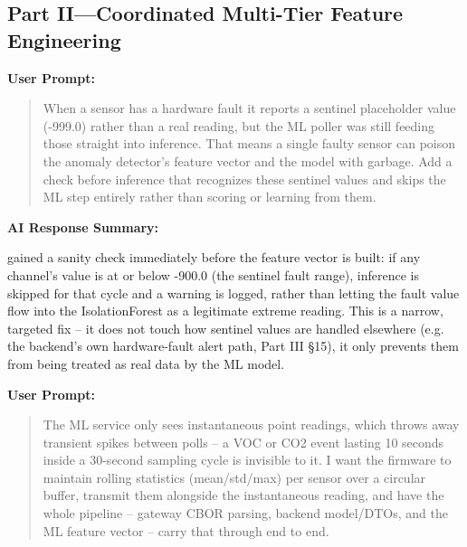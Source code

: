 \documentclass[conference]{IEEEtran}
\begin{document}
\subsection*{Part II---Coordinated Multi-Tier Feature Engineering}

\par\vspace{4pt}\par\vspace{2pt}

\noindent\textbf{User Prompt:}\par

\begin{quote}
When a sensor has a hardware fault it reports a sentinel placeholder value (-999.0) rather than a real reading, but the ML poller was still feeding those straight into inference. That means a single faulty sensor can poison the anomaly detector's feature vector and the model with garbage. Add a check before inference that recognizes these sentinel values and skips the ML step entirely rather than scoring or learning from them.
\end{quote}

\noindent\textbf{AI Response Summary:}\par

\texttt{} gained a sanity check immediately before the feature vector is built: if any channel's value is at or below -900.0 (the sentinel fault range), inference is skipped for that cycle and a warning is logged, rather than letting the fault value flow into the IsolationForest as a legitimate extreme reading. This is a narrow, targeted fix -- it does not touch how sentinel values are handled elsewhere (e.g. the backend's own hardware-fault alert path, Part III \S15), it only prevents them from being treated as real data by the ML model.

\par\vspace{4pt}\par\vspace{2pt}

\noindent\textbf{User Prompt:}\par

\begin{quote}
The ML service only sees instantaneous point readings, which throws away transient spikes between polls -- a VOC or CO2 event lasting 10 seconds inside a 30-second sampling cycle is invisible to it. I want the firmware to maintain rolling statistics (mean/std/max) per sensor over a circular buffer, transmit them alongside the instantaneous reading, and have the whole pipeline -- gateway CBOR parsing, backend model/DTOs, and the ML feature vector -- carry that through end to end.
\end{quote}
\end{document}
